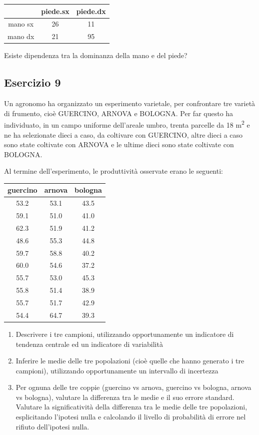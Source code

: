 \documentclass[a4paper,12pt,oneside]{book}
\providecommand{\tightlist}{%
  \setlength{\itemsep}{0pt}\setlength{\parskip}{0pt}}
\begin{document}
\begin{longtable}[]{@{}ccc@{}}
\toprule
& piede.sx & piede.dx \\
\midrule
\endhead
mano sx & 26 & 11 \\
mano dx & 21 & 95 \\
\bottomrule
\end{longtable}

Esiste dipendenza tra la dominanza della mano e del piede?

\hypertarget{esercizio-9}{%
\subsection{Esercizio 9}\label{esercizio-9}}

Un agronomo ha organizzato un esperimento varietale, per confrontare tre varietà di frumento, cioè GUERCINO, ARNOVA e BOLOGNA. Per far questo ha individuato, in un campo uniforme dell'areale umbro, trenta parcelle da 18 m\textsuperscript{2} e ne ha selezionate dieci a caso, da coltivare con GUERCINO, altre dieci a caso sono state coltivate con ARNOVA e le ultime dieci sono state coltivate con BOLOGNA.

Al termine dell'esperimento, le produttività osservate erano le seguenti:

\begin{tabular}{c|c|c}
\hline
guercino & arnova & bologna\\
\hline
53.2 & 53.1 & 43.5\\
\hline
59.1 & 51.0 & 41.0\\
\hline
62.3 & 51.9 & 41.2\\
\hline
48.6 & 55.3 & 44.8\\
\hline
59.7 & 58.8 & 40.2\\
\hline
60.0 & 54.6 & 37.2\\
\hline
55.7 & 53.0 & 45.3\\
\hline
55.8 & 51.4 & 38.9\\
\hline
55.7 & 51.7 & 42.9\\
\hline
54.4 & 64.7 & 39.3\\
\hline
\end{tabular}

\begin{enumerate}
\def\labelenumi{\arabic{enumi}.}
\tightlist
\item
  Descrivere i tre campioni, utilizzando opportunamente un indicatore di tendenza centrale ed un indicatore di variabilità
\item
  Inferire le medie delle tre popolazioni (cioè quelle che hanno generato i tre campioni), utilizzando opportunamente un intervallo di incertezza
\item
  Per ognuna delle tre coppie (guercino vs arnova, guercino vs bologna, arnova vs bologna), valutare la differenza tra le medie e il suo errore standard. Valutare la significatività della differenza tra le medie delle tre popolazioni, esplicitando l'ipotesi nulla e calcolando il livello di probabilità di errore nel rifiuto dell'ipotesi nulla.
\end{enumerate}
\end{document}
